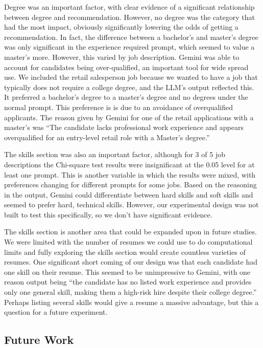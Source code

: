 \documentclass[11pt,letterpaper]{article}
\begin{document}
Degree was an important factor, with clear evidence of a significant relationship between degree and recommendation. However, no degree was the category that had the most impact, obviously significantly lowering the odds of getting a recommendation. In fact, the difference between a bachelor's and master's degree was only significant in the experience required prompt, which seemed to value a master's more. However, this varied by job description. Gemini was able to account for candidates being over-qualified, an important tool for wide spread use. We included the retail salesperson job because we wanted to have a job that typically does not require a college degree, and the LLM's output reflected this. It preferred a bachelor's degree to a master's degree and no degrees under the normal prompt. This preference is is due to an avoidance of overqualified applicants. The reason given by Gemini for one of the retail applications with a master's was ``The candidate lacks professional work experience and appears overqualified for an entry-level retail role with a Master's degree.'' \cite{gemini} 

The skills section was also an important factor, although for 3 of 5 job descriptions the Chi-square test results were insignificant at the 0.05 level for at least one prompt. This is another variable in which the results were mixed, with preferences changing for different prompts for some jobs. Based on the reasoning in the output, Gemini could differentiate between hard skills and soft skills and seemed to prefer hard, technical skills. However, our experimental design was not built to test this specifically, so we don't have significant evidence. 

The skills section is another area that could be expanded upon in future studies. We were limited with the number of resumes we could use to do computational limits and fully exploring the skills section would create countless varieties of resumes. One significant short coming of our design was that each candidate had one skill on their resume. This seemed to be unimpressive to Gemini, with one reason output being ``the candidate has no listed work experience and provides only one general skill, making them a high-risk hire despite their college degree.'' \cite{gemini} Perhaps listing several skills would give a resume a massive advantage, but this a question for a future experiment.


\subsection{Future Work}
\end{document}

